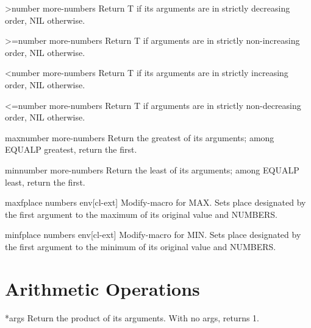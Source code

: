 \documentclass[10pt,english]{book}
\begin{document}
\begin{function}{>}{number \rest more-numbers}
  Return T if its arguments are in strictly decreasing order, NIL otherwise.
\end{function}

\begin{function}{>=}{number \rest more-numbers}
  Return T if arguments are in strictly non-increasing order, NIL otherwise.
\end{function}

\begin{function}{<}{number \rest more-numbers}
  Return T if its arguments are in strictly increasing order, NIL otherwise.
\end{function}

\begin{function}{<=}{number \rest more-numbers}
  Return T if arguments are in strictly non-decreasing order, NIL otherwise.
\end{function}

\begin{function}{max}{number \rest more-numbers}
  Return the greatest of its arguments; among EQUALP greatest, return
the first.
\end{function}

\begin{function}{min}{number \rest more-numbers}
  Return the least of its arguments; among EQUALP least, return
the first.
\end{function}

\begin{macro}{maxf}{place \rest numbers \env env}[cl-ext]
  Modify-macro for MAX. Sets place designated by the first argument to the
maximum of its original value and NUMBERS.
\end{macro}

\begin{macro}{minf}{place \rest numbers \env env}[cl-ext]
  Modify-macro for MIN. Sets place designated by the first argument to the
minimum of its original value and NUMBERS.
\end{macro}

\section{Arithmetic Operations}
\label{sec:arithm-oper}

\begin{function}{*}{\rest args}
  Return the product of its arguments. With no args, returns 1.
\end{function}
\end{document}
